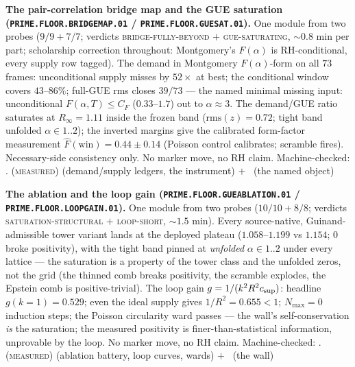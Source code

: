 \documentclass[11pt,a4paper]{article}
\theoremstyle{definition}
\begin{document}
\par\smallskip\noindent\textbf{The pair-correlation bridge map and
the GUE saturation (\texttt{PRIME.FLOOR.BRIDGEMAP.01} /
\texttt{PRIME.FLOOR.GUESAT.01}).}
One module from two probes ($9/9 + 7/7$; verdicts
\textsc{bridge-fully-beyond} $+$ \textsc{gue-saturating},
$\sim0.8$ min per part; scholarship correction throughout:
Montgomery's $F(\alpha)$ is RH-conditional, every supply row
tagged).  The demand in Montgomery $F(\alpha)$-form on all $73$
frames: unconditional supply misses by $52\times$ at best; the
conditional window covers $43$--$86\%$; full-GUE rms closes
$39/73$ --- the named minimal missing input: unconditional
$F(\alpha, T) \le C_F$ ($0.33$--$1.7$) out to $\alpha \approx 3$.
The demand/GUE ratio saturates at $R_\infty = 1.11$ inside the
frozen band ($\mathrm{rms}(z) = 0.72$; tight band unfolded
$\alpha \in 1..2$); the inverted margins give the calibrated
form-factor measurement $\hat F(\mathrm{win}) = 0.44 \pm 0.14$
(Poisson control calibrates; scramble fires).  Necessary-side
consistency only.  No marker move, no RH claim.
Machine-checked: .
(\textsc{measured}) (demand/supply ledgers, the instrument) $+$
\mO\ (the named object)
\par\smallskip

\par\smallskip\noindent\textbf{The ablation and the loop gain
(\texttt{PRIME.FLOOR.GUEABLATION.01} /
\texttt{PRIME.FLOOR.LOOPGAIN.01}).}
One module from two probes ($10/10 + 8/8$; verdicts
\textsc{saturation-structural} $+$ \textsc{loop-short},
$\sim1.5$ min).  Every source-native, Guinand-admissible tower
variant lands at the deployed plateau ($1.058$--$1.199$ vs
$1.154$; $0$ broke positivity), with the tight band pinned at
\emph{unfolded} $\alpha \in 1..2$ under every lattice --- the
saturation is a property of the tower class and the unfolded
zeros, not the grid (the thinned comb breaks positivity, the
scramble explodes, the Epstein comb is positive-trivial).  The
loop gain $g = 1/(k^2R^2c_{\rm sup})$: headline
$g(k{=}1) = 0.529$; even the ideal supply gives $1/R^2 = 0.655 <
1$; $N_{\max} = 0$ induction steps; the Poisson circularity ward
passes --- the wall's self-conservation \emph{is} the saturation;
the measured positivity is finer-than-statistical information,
unprovable by the loop.  No marker move, no RH claim.
Machine-checked: .
(\textsc{measured}) (ablation battery, loop curves, wards) $+$
\mO\ (the wall)
\par\smallskip
\end{document}
